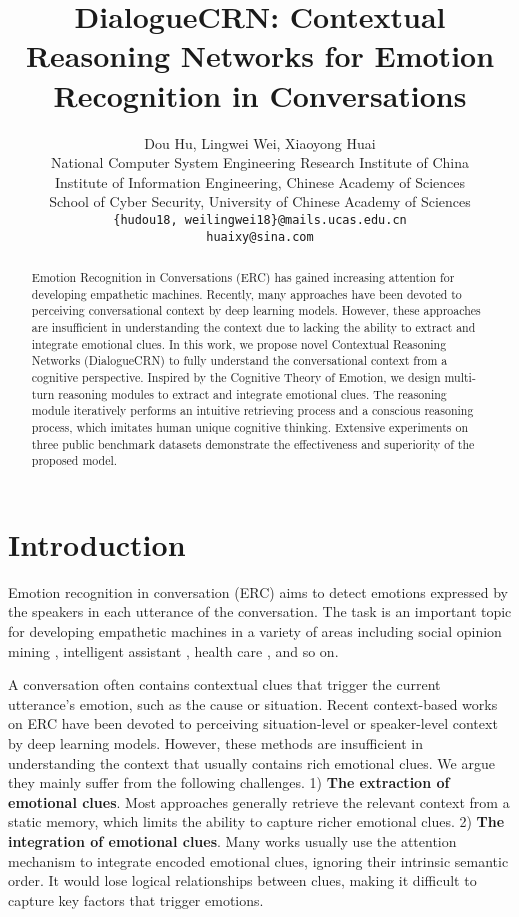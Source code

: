 \documentclass[11pt,a4paper]{article}
\title{DialogueCRN: Contextual Reasoning Networks for Emotion Recognition in Conversations}
\author{Dou Hu, Lingwei Wei, Xiaoyong Huai \\
 National Computer System Engineering Research Institute of China \\ 
 Institute of Information Engineering, Chinese Academy of Sciences \\
 School of Cyber Security, University of Chinese Academy of Sciences \\
  \texttt{\{hudou18, weilingwei18\}@mails.ucas.edu.cn} { } \\
  \texttt{huaixy@sina.com} \\ }
\date{}
\begin{document}
\maketitle
\begin{abstract}
Emotion Recognition in Conversations (ERC) has gained increasing attention for developing empathetic machines. Recently, many approaches have been devoted to perceiving conversational context by deep learning models. However, these approaches are insufficient in understanding the context due to lacking the ability to extract and integrate emotional clues. In this work, we propose novel Contextual Reasoning Networks (DialogueCRN) to fully understand the conversational context from a cognitive perspective. Inspired by the Cognitive Theory of Emotion, we design multi-turn reasoning modules to extract and integrate emotional clues. The reasoning module iteratively performs an intuitive retrieving process and a conscious reasoning process, which imitates human unique cognitive thinking. Extensive experiments on three public benchmark datasets demonstrate the effectiveness and superiority of the proposed model. 

\end{abstract}

\section{Introduction}
Emotion recognition in conversation (ERC) aims to detect emotions expressed by the speakers in each utterance of the conversation. 
The task is an important topic for developing empathetic machines
\cite{DBLP:journals/coling/ZhouGLS20} in a variety of areas including social opinion mining \cite{DBLP:conf/ic3/KumarDD15}, intelligent assistant \cite{DBLP:conf/ph/KonigFMH16}, health care \cite{DBLP:conf/riiforum/PujolMM19}, and so on.

A conversation often contains contextual clues \cite{DBLP:conf/acl/PoriaHMNCM19} that trigger the current utterance's emotion, such as the cause or situation.
Recent context-based works \cite{DBLP:conf/acl/PoriaCHMZM17,DBLP:conf/naacl/HazarikaPZCMZ18,DBLP:conf/aaai/MajumderPHMGC19} on ERC have been devoted to perceiving situation-level or speaker-level context by deep learning models.
However, these methods are insufficient in understanding the context that usually contains rich emotional clues.
We argue they mainly suffer from the following challenges.
1) \textbf{The extraction of emotional clues}. Most approaches \cite{DBLP:conf/emnlp/HazarikaPMCZ18,DBLP:conf/naacl/HazarikaPZCMZ18,DBLP:conf/aaai/JiaoLK20} generally retrieve the relevant context from a static memory, which limits the ability to capture richer emotional clues.
2) \textbf{The integration of emotional clues}. 
Many works \cite{DBLP:conf/aaai/MajumderPHMGC19,DBLP:conf/emnlp/GhosalMPCG19,DBLP:conf/coling/LuZWTCQ20} usually use the attention mechanism to integrate encoded emotional clues, ignoring their intrinsic semantic order.  It would lose logical relationships between clues, making it difficult to capture key factors that trigger emotions.  
\end{document}
